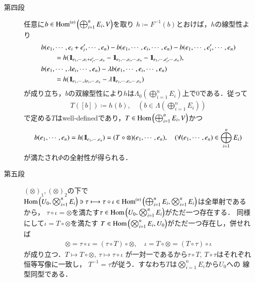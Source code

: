 \begin{prf}
\begin{description}
			\item[第四段]
				任意に$b \in \Ln{\bigoplus_{i=1}^n E_i}{V}{n}$を取り
				$h \coloneqq F^{-1}(b)$とおけば，$h$の線型性より
				\begin{align}
					&b(e_1,\cdots,e_i+e_i',\cdots,e_n) - b(e_1,\cdots,e_i,\cdots,e_n) - b(e_1,\cdots,e_i',\cdots,e_n) \\
					&\qquad = h(\defunc_{e_1,\cdots,e_i+e_i',\cdots,e_n} - \defunc_{e_1,\cdots,e_i,\cdots,e_n} - \defunc_{e_1,\cdots,e_i',\cdots,e_n}), \\
					&b(e_1,\cdots,\lambda e_i,\cdots,e_n) - \lambda b(e_1,\cdots,e_i,\cdots,e_n) \\
					&\qquad = h(\defunc_{e_1,\cdots,\lambda e_i,\cdots,e_n} - \lambda \defunc_{e_1,\cdots,e_i,\cdots,e_n})
				\end{align}
				が成り立ち，$b$の双線型性により$h$は$\Lambda_0(\bigoplus_{i=1}^n E_i)$上で0である．従って
				\begin{align}
					T([b]) \coloneqq h(b),
					\quad (b \in \Lambda(\bigoplus_{i=1}^n E_i))
				\end{align}
				で定める$T$はwell-definedであり，$T \in \Hom{\bigoplus_{i=1}^n E_i}{V}$かつ
				\begin{align}	
					b(e_1,\cdots,e_n) = h(\defunc_{e_1,\cdots,e_n}) = (T \circ \otimes) (e_1,\cdots,e_n),
					\quad (\forall (e_1,\cdots,e_n) \in \bigoplus_{i=1}^n E_i)
				\end{align}
				が満たされ$\Phi$の全射性が得られる．
				
			\item[第五段]
				$(\otimes)_1,(\otimes)_2$の下で
				$\Hom{U_0}{\bigotimes_{i=1}^n E_i} \ni \tau \longmapsto \tau \circ \iota \in \Ln{\bigoplus_{i=1}^n E_i}{\bigotimes_{i=1}^n E_i}{n}$は全単射であるから，
				$\tau \circ \iota = \otimes$を満たす$\tau \in \Hom{U_0}{\bigotimes_{i=1}^n E_i}$がただ一つ存在する．
				同様にして$\iota = T \circ \otimes$を満たす
				$T \in \Hom{\bigotimes_{i=1}^n E_i}{U_0}$がただ一つ存在し，併せれば
				\begin{align}
					\otimes = \tau \circ \iota = (\tau \circ T) \circ \otimes,
					\quad \iota = T \circ \otimes = (T \circ \tau) \circ \iota
				\end{align}
				が成り立つ．$T \longmapsto T \circ \otimes,\ \tau \longmapsto \tau \circ \iota$
				が一対一であるから$\tau \circ T,\ T \circ \tau$はそれぞれ恒等写像に一致し，
				$T^{-1} = \tau$が従う．すなわち$T$は$\bigotimes_{i=1}^n E_i$から$U_0$への
				線型同型である．
				\QED
		\end{description}
	\end{prf}
	
